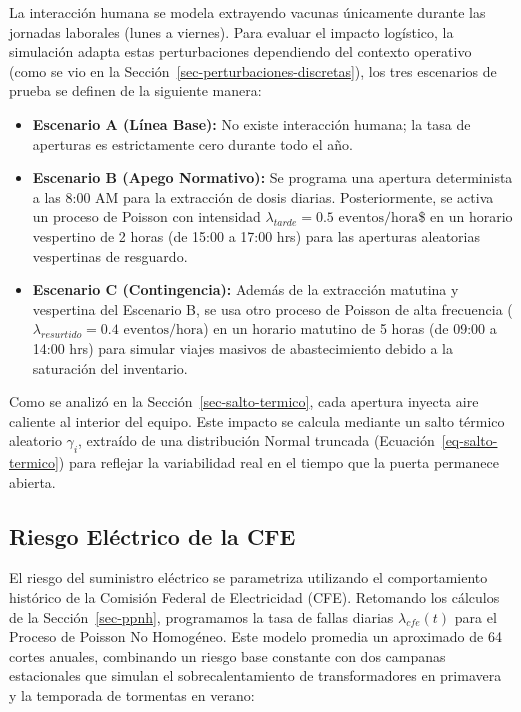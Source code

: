 \documentclass[
  spanish,
  us-letterpaper,
]{scrreprt}
\providecommand{\tightlist}{%
  \setlength{\itemsep}{0pt}\setlength{\parskip}{0pt}}
\numberwithin{equation}{section}
\theoremstyle{plain}
\theoremstyle{plain}
\theoremstyle{definition}
\theoremstyle{plain}
\theoremstyle{remark}
\begin{document}
La interacción humana se modela extrayendo vacunas únicamente durante
las jornadas laborales (lunes a viernes). Para evaluar el impacto
logístico, la simulación adapta estas perturbaciones dependiendo del
contexto operativo (como se vio en la
Sección~\ref{sec-perturbaciones-discretas}), los tres escenarios de
prueba se definen de la siguiente manera:

\begin{itemize}
\tightlist
\item
  \textbf{Escenario A (Línea Base):} No existe interacción humana; la
  tasa de aperturas es estrictamente cero durante todo el año.
\item
  \textbf{Escenario B (Apego Normativo):} Se programa una apertura
  determinista a las 8:00 AM para la extracción de dosis diarias.
  Posteriormente, se activa un proceso de Poisson con intensidad
  \(\lambda_{tarde} = 0.5 \text{ eventos/hora}\)\$ en un horario
  vespertino de 2 horas (de 15:00 a 17:00 hrs) para las aperturas
  aleatorias vespertinas de resguardo.
\item
  \textbf{Escenario C (Contingencia):} Además de la extracción matutina
  y vespertina del Escenario B, se usa otro proceso de Poisson de alta
  frecuencia (\(\lambda_{resurtido} = 0.4 \text{ eventos/hora}\)) en un
  horario matutino de 5 horas (de 09:00 a 14:00 hrs) para simular viajes
  masivos de abastecimiento debido a la saturación del inventario.
\end{itemize}

Como se analizó en la Sección~\ref{sec-salto-termico}, cada apertura
inyecta aire caliente al interior del equipo. Este impacto se calcula
mediante un salto térmico aleatorio \(\gamma_i\), extraído de una
distribución Normal truncada (Ecuación~\ref{eq-salto-termico}) para
reflejar la variabilidad real en el tiempo que la puerta permanece
abierta.

\subsection{Riesgo Eléctrico de la CFE}\label{sec-riesgo-cfe}

El riesgo del suministro eléctrico se parametriza utilizando el
comportamiento histórico de la Comisión Federal de Electricidad (CFE).
Retomando los cálculos de la Sección~\ref{sec-ppnh}, programamos la tasa
de fallas diarias \(\lambda_{cfe}(t)\) para el Proceso de Poisson No
Homogéneo. Este modelo promedia un aproximado de 64 cortes anuales,
combinando un riesgo base constante con dos campanas estacionales que
simulan el sobrecalentamiento de transformadores en primavera y la
temporada de tormentas en verano:
\end{document}
